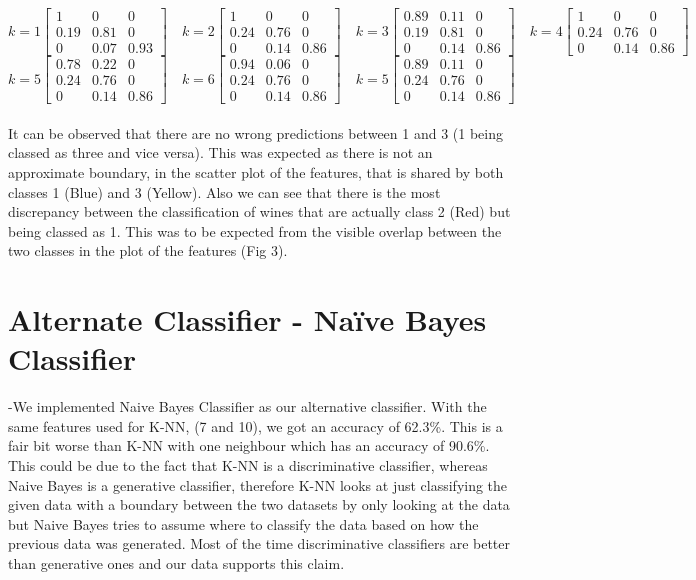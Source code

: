 \documentclass[10pt]{article}
\begin{document}
$$
k=1
\begin{bmatrix} 
1 & 0 & 0\\
0.19 & 0.81 & 0\\
0 & 0.07 & 0.93
\end{bmatrix}
\quad
k=2
\begin{bmatrix} 
1 & 0 & 0\\
0.24 & 0.76 & 0\\
0 & 0.14 & 0.86
\end{bmatrix}
\quad
k=3
\begin{bmatrix} 
0.89 & 0.11 & 0\\
0.19 & 0.81 & 0\\
0 & 0.14 & 0.86
\end{bmatrix}
\quad
k=4
\begin{bmatrix} 
1 & 0 & 0\\
0.24 & 0.76 & 0\\
0 & 0.14 & 0.86
\end{bmatrix}
$$
$$
k=5
\begin{bmatrix} 
0.78 & 0.22 & 0\\
0.24 & 0.76 & 0\\
0 & 0.14 & 0.86
\end{bmatrix}
\quad
k=6
\begin{bmatrix} 
0.94 & 0.06 & 0\\
0.24 & 0.76 & 0\\
0 & 0.14 & 0.86
\end{bmatrix}
\quad
k=5
\begin{bmatrix} 
0.89 & 0.11 & 0\\
0.24 & 0.76 & 0\\
0 & 0.14 & 0.86
\end{bmatrix}
\quad
$$
\\
\noindent
It can be observed that there are no wrong predictions between 1 and 3 (1 being classed as three and vice versa). This was expected as there is not an approximate boundary, in the scatter plot of the features, that is shared by both classes 1 (Blue) and 3 (Yellow). Also we can see that there is the most discrepancy between the classification of wines that are actually class 2 (Red) but being classed as 1. This was to be expected from the visible overlap between the two classes in the plot of the features (Fig 3).

\section*{Alternate Classifier - Na\"ive Bayes Classifier}
-We implemented Naive Bayes Classifier as our alternative classifier. With the same features used for K-NN, (7 and 10), we got an accuracy of 62.3\%. This is a fair bit worse than K-NN with one neighbour which has an accuracy of 90.6\%. This could be due to the fact that K-NN is a discriminative classifier, whereas Naive Bayes is a generative classifier, therefore K-NN looks at just classifying the given data with a boundary between the two datasets by only looking at the data but Naive Bayes tries to assume where to classify the data based on how the previous data was generated. Most of the time discriminative classifiers are better than generative ones and our data supports this claim.\\
\end{document}
